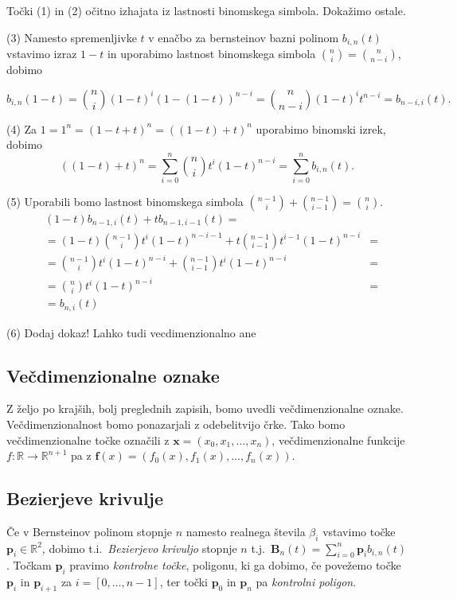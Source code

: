 \documentclass[isrm2, tisk]{fmfdelo}
\newcommand{\R}{\mathbb R}
\newcommand{\p}{\textbf{p}}
\newcommand{\bernstein}[2]{\binom{#1}{#2}t^{#2}(1-t)^{#1-#2}}
\newcommand{\lilb}[2]{b_{#1,#2}(t)}
\newcommand{\bigbb}[1]{\textbf{B}_{#1}(t)}
\newcommand{\bernsteinsump}[2]{\sum_{#1=0}^{#2} \p_{#1}\lilb{#1}{#2}}
\begin{document}
    \begin{dokaz}
        Točki (1) in (2) očitno izhajata iz lastnosti binomskega simbola.
        Dokažimo ostale.

        \noindent(3) Namesto spremenljivke $t$ v enačbo za bernsteinov bazni polinom $\lilb{i}{n}$ vstavimo izraz $1-t$ in uporabimo lastnost binomskega simbola $\binom{n}{i} = \binom{n}{n-i}$, dobimo

        \[b_{i,n}(1-t) = \binom{n}{i}(1-t)^i(1-(1-t))^{n-i} =  \binom{n}{n-i}(1-t)^it^{n-i} = b_{n-i,i}(t).\]

        \noindent(4) Za $1 = 1^n = (1-t+t)^n = ((1-t) + t)^n$ uporabimo binomski izrek, dobimo
        \[\left((1-t) + t\right)^n = \sum_{i=0}^{n}\bernstein{n}{i} = \sum_{i=0}^n \lilb{i}{n}.\]

        \noindent(5) Uporabili bomo lastnost binomskega simbola $ \binom{n-1}{i} + \binom{n-1}{i-1} = \binom{n}{i}.$
        \begin{align}
            &(1-t)\lilb{n-1}{i} + t\lilb{n-1}{i-1} = \nonumber \\
            &= (1-t)\binom{n-1}{i}t^{i}(1-t)^{n-i-1} + t\binom{n-1}{i-1}t^{i-1}(1-t)^{n-i} &= \nonumber \\
            &= \binom{n-1}{i}t^{i}(1-t)^{n-i} + \binom{n-1}{i-1}t^{i}(1-t)^{n-i} &= \nonumber \\
            &= \binom{n}{i}t^{i}(1-t)^{n-i} &= \nonumber \\
            &= \lilb{n}{i}
        \end{align}

        \noindent(6) Dodaj dokaz!
        Lahko tudi vecdimenzionalno ane
    \end{dokaz}

    \subsection{Večdimenzionalne oznake}
    Z željo po krajših, bolj preglednih zapisih, bomo uvedli večdimenzionalne oznake.
    Večdimenzionalnost bomo ponazarjali z odebelitvijo črke.
    Tako bomo večdimenzionalne točke označili z $\mathbf{x}=(x_0,x_1,\dots,x_n)$, večdimenzionalne funkcije $f:\R\to\R^{n+1}$ pa z $\mathbf{f}(x)=\left( f_0(x),f_1(x),\dots,f_n(x) \right)$.

    \subsection{Bezierjeve krivulje}
    Če v Bernsteinov polinom stopnje $n$ namesto realnega števila $\beta_i$ vstavimo točke $\p_i\in\R^2$, dobimo t.i.\ \textit{Bezierjevo krivuljo} stopnje $n$  t.j.\ $\bigbb{n}=\bernsteinsump{i}{n}$.
    Točkam $\p_i$ pravimo \textit{kontrolne točke}, poligonu, ki ga dobimo, če povežemo točke $\p_i$ in $\p_{i+1}$ za $i=[0,\dots,n-1]$, ter točki $\p_0$ in $\p_n$ pa \textit{kontrolni poligon}.
\end{document}
